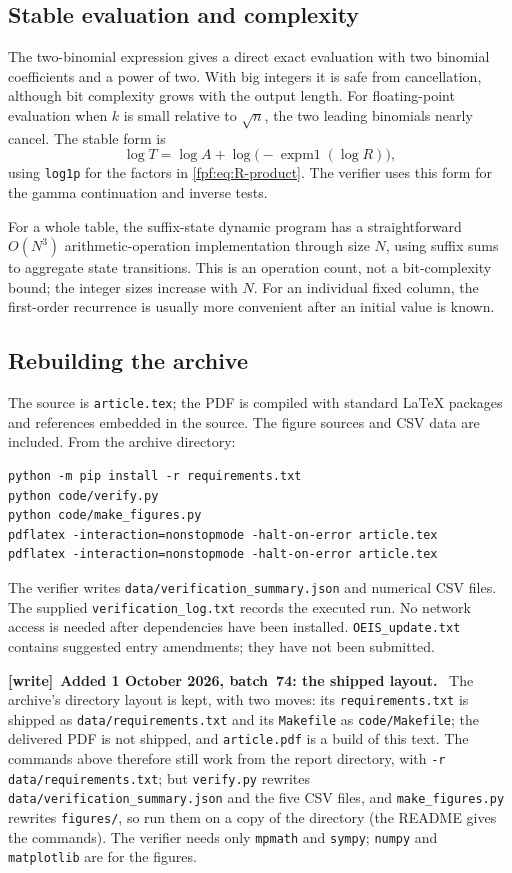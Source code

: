 \documentclass[11pt]{article}
\numberwithin{equation}{section}
\theoremstyle{definition}
\newenvironment{writenote}[1][]{\par\smallskip\begingroup\small
 \noindent\textbf{[write]}\if\relax\detokenize{#1}\relax\else~\textbf{#1.}\fi\ }%
 {\par\endgroup\smallskip}
\begin{document}
\subsection{Stable evaluation and complexity}
The two-binomial expression gives a direct exact evaluation with two
binomial coefficients and a power of two. With big integers it is safe
from cancellation, although bit complexity grows with the output length.
For floating-point evaluation when $k$ is small relative to $\sqrt n$,
the two leading binomials nearly cancel. The stable form is
\begin{equation}\label{fpf:eq:stable-eval}
 \log T=\log A+\log\bigl(-\operatorname{expm1}(\log R)\bigr),
\end{equation}
using \texttt{log1p} for the factors in \eqref{fpf:eq:R-product}.
The verifier uses this form for the gamma continuation and inverse tests.

For a whole table, the suffix-state dynamic program has a straightforward
$O(N^3)$ arithmetic-operation implementation through size $N$, using suffix
sums to aggregate state transitions. This is an operation count, not a
bit-complexity bound; the integer sizes increase with $N$. For an individual
fixed column, the first-order recurrence is usually more convenient after
an initial value is known.

\subsection{Rebuilding the archive}
The source is \texttt{article.tex}; the PDF is compiled with standard
LaTeX packages and references embedded in the source. The figure sources
and CSV data are included. From the archive directory:
\begin{verbatim}
python -m pip install -r requirements.txt
python code/verify.py
python code/make_figures.py
pdflatex -interaction=nonstopmode -halt-on-error article.tex
pdflatex -interaction=nonstopmode -halt-on-error article.tex
\end{verbatim}
The verifier writes \texttt{data/verification\_summary.json} and numerical
CSV files. The supplied \texttt{verification\_log.txt} records the executed
run. No network access is needed after dependencies have been installed.
\texttt{OEIS\_update.txt} contains suggested entry amendments; they have
not been submitted.

\begin{writenote}[Added 1 October 2026, batch~74: the shipped layout]
The archive's directory layout is kept, with two moves: its
\texttt{requirements.txt} is shipped as \texttt{data/requirements.txt} and
its \texttt{Makefile} as \texttt{code/Makefile}; the delivered PDF is not
shipped, and \texttt{article.pdf} is a build of this text. The commands
above therefore still work from the report directory, with
\texttt{-r data/requirements.txt}; but \texttt{verify.py} rewrites
\texttt{data/verification\_summary.json} and the five CSV files, and
\texttt{make\_figures.py} rewrites \texttt{figures/}, so run them on a copy
of the directory (the README gives the commands). The verifier needs only
\texttt{mpmath} and \texttt{sympy}; \texttt{numpy} and
\texttt{matplotlib} are for the figures.
\end{writenote}
\end{document}
